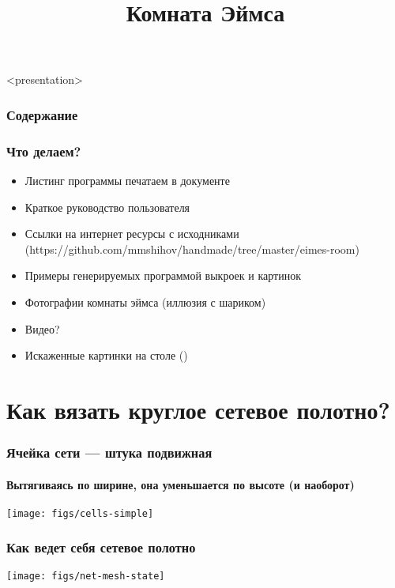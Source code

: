

\title[Комната Эймса]{Комната Эймса}



\begin{frame}<presentation>
    \frametitle{Содержание}
    \tableofcontents
\end{frame}

\begin{frame}
    \frametitle{Что делаем?}

	\begin{itemize}
		\item Листинг программы печатаем в документе
		\item Краткое руководство пользователя
		\item Ссылки на интернет ресурсы с исходниками (https://github.com/mmshihov/handmade/tree/master/eimes-room)
		\item Примеры генерируемых программой выкроек и картинок
		\item Фотографии комнаты эймса (иллюзия с шариком)
		\item Видео?
		\item Искаженные картинки на столе ()
	\end{itemize}
\end{frame}


\section{Как вязать круглое сетевое полотно?}

\begin{frame}
    \frametitle{Ячейка сети --- штука подвижная}
    \framesubtitle{Вытягиваясь по ширине, она уменьшается по высоте (и наоборот)}

    \begin{center}
        \texttt{[image: figs/cells-simple]}
    \end{center}
\end{frame}

\begin{frame}
    \frametitle{Как ведет себя сетевое полотно}

    \begin{center}
        \texttt{[image: figs/net-mesh-state]}
    \end{center}
\end{frame}


